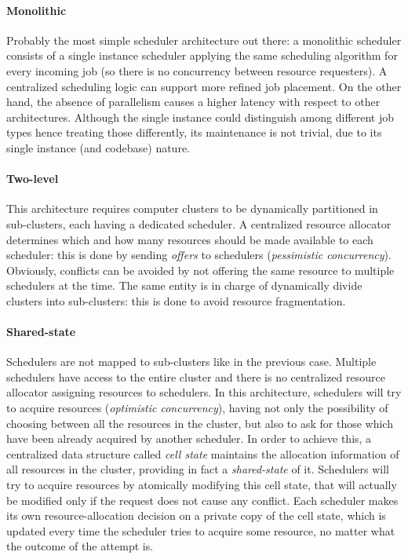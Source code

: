 \paragraph{Monolithic}
Probably the most simple scheduler architecture out there: a monolithic scheduler consists of a single instance scheduler applying the same scheduling algorithm for every incoming job (so there is no concurrency between resource requesters).
A centralized scheduling logic can support more refined job placement.
On the other hand, the absence of parallelism causes a higher latency with respect to other architectures.
Although the single instance could distinguish among different job types hence treating those differently, its maintenance is not trivial, due to its single instance (and codebase) nature.

\paragraph{Two-level}
This architecture requires computer clusters to be dynamically partitioned in sub-clusters, each having a dedicated scheduler.
A centralized resource allocator determines which and how many resources should be made available to each scheduler: this is done by sending \textit{offers} to schedulers (\textit{pessimistic concurrency}).
Obviously, conflicts can be avoided by not offering the same resource to multiple schedulers at the time.
The same entity is in charge of dynamically divide clusters into sub-clusters: this is done to avoid resource fragmentation.

\paragraph{Shared-state}
Schedulers are not mapped to sub-clusters like in the previous case.
Multiple schedulers have access to the entire cluster and there is no centralized resource allocator assigning resources to schedulers.
In this architecture, schedulers will try to acquire resources (\textit{optimistic concurrency}), having not only the possibility of choosing between all the resources in the cluster, but also to ask for those which have been already acquired by another scheduler.
In order to achieve this, a centralized data structure called \textit{cell state} maintains the allocation information of all resources in the cluster, providing in fact a \textit{shared-state} of it.
Schedulers will try to acquire resources by atomically modifying this cell state, that will actually be modified only if the request does not cause any conflict.
Each scheduler makes its own resource-allocation decision on a private copy of the cell state, which is updated every time the scheduler tries to acquire some resource, no matter what the outcome of the attempt is.